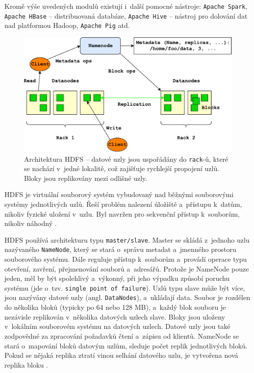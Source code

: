 \noindent Kromě výše uvedených modulů existují i~další pomocné nástroje:  \texttt{Apache Spark}, \texttt{Apache HBase} -- distribuovaná databáze, \texttt{Apache Hive} -- nástroj pro dolování dat nad platformou Hadoop, \texttt{Apache Pig} atd.

\begin{figure}[!h]
  \centering
  \includegraphics[width=15cm]{template-fig/HDFSArchitecture.pdf}
  \caption{Architektura HDFS \cite{apacheHDFSGuide} -- datové uzly jsou uspořádány do \texttt{rack}-ů, které se nachází v~jedné lokalitě, což zajišťuje rychlejší propojení uzlů. Bloky jsou replikovány mezi odlišné uzly.}
  \label{FIG_HDFSArchitecture}
\end{figure}

\noindent HDFS je virtuální souborový systém vybudovaný nad běžnými souborovými systémy jednotlivých uzlů. Řeší problém nalezení úložiště a~přístupu k~datům, nikoliv fyzické uložení v~uzlu. Byl navržen pro sekvenční přístup k~souborům, nikoliv náhodný \cite{hadoopPdi}.

HDFS používá architekturu typu \texttt{master/slave}. Master se skládá z~jednoho uzlu nazývaného \texttt{NameNode}, který se stará o~správu metadat a~jmenného prostoru souborového systému. Dále reguluje přístup k~souborům a~provádí operace typu otevření, zavření, přejmenování souborů a~adresářů. Protože je NameNode pouze jeden, měl by být spolehlivý a~výkonný, při jeho výpadku způsobí poruchu systému (jde o~tzv. \texttt{single point of failure}). Uzlů typu slave může být více, jsou nazývány datové uzly (angl. \texttt{DataNodes}), a~ukládají data. Soubor je rozdělen do několika bloků (typicky po 64 nebo 128 MB), a~každý blok souboru je nezávisle replikován v~několika datových uzlech slave. Bloky jsou uloženy v~lokálním souborovém systému na datových uzlech. Datové uzly jsou také zodpovědné za zpracování požadavků čtení a~zápisu od klientů. NameNode se stará o~mapování bloků datovým uzlům, sleduje počet replik jednotlivých bloků. Pokud se nějaká replika ztratí vinou selhání datového uzlu, je vytvořena nová replika bloku \cite{hadoopHortonworks}.

